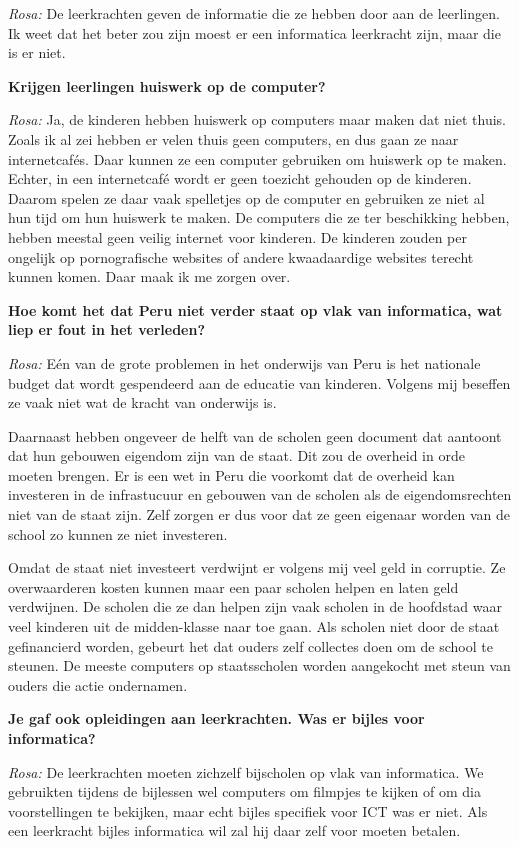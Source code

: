 \textit{Rosa:} De leerkrachten geven de informatie die ze hebben door aan de leerlingen. Ik weet dat het beter zou zijn moest er een informatica leerkracht zijn, maar die is er niet.

\textbf{Krijgen leerlingen huiswerk op de computer?}

\textit{Rosa:} Ja, de kinderen hebben huiswerk op computers maar maken dat niet thuis. Zoals ik al zei hebben er velen thuis geen computers, en dus gaan ze naar internetcafés. Daar kunnen ze een computer gebruiken om huiswerk op te maken. Echter, in een internetcafé wordt er geen toezicht gehouden op de kinderen. Daarom spelen ze daar vaak spelletjes op de computer en gebruiken ze niet al hun tijd om hun huiswerk te maken. De computers die ze ter beschikking hebben, hebben meestal geen veilig internet voor kinderen. De kinderen zouden per ongelijk op pornografische websites of andere kwaadaardige websites terecht kunnen komen. Daar maak ik me zorgen over.

\textbf{Hoe komt het dat Peru niet verder staat op vlak van informatica, wat liep er fout in het verleden?}

\textit{Rosa:} Eén van de grote problemen in het onderwijs van Peru is het nationale budget dat wordt gespendeerd aan de educatie van kinderen. Volgens mij beseffen ze vaak niet wat de kracht van onderwijs is. 

Daarnaast hebben ongeveer de helft van de scholen geen document dat aantoont dat hun gebouwen eigendom zijn van de staat. Dit zou de overheid in orde moeten brengen. Er is een wet in Peru die voorkomt dat de overheid kan investeren in de infrastucuur en gebouwen van de scholen als de eigendomsrechten niet van de staat zijn. Zelf zorgen er dus voor dat ze geen eigenaar worden van de school zo kunnen ze niet investeren.

Omdat de staat niet investeert verdwijnt er volgens mij veel geld in corruptie. Ze overwaarderen kosten kunnen maar een paar scholen helpen en laten geld verdwijnen. De scholen die ze dan helpen zijn vaak scholen in de hoofdstad waar veel kinderen uit de midden-klasse naar toe gaan. Als scholen niet door de staat gefinancierd worden, gebeurt het dat ouders zelf collectes doen om de school te steunen. De meeste computers op staatsscholen worden aangekocht met steun van ouders die actie ondernamen. 

\textbf{Je gaf ook opleidingen aan leerkrachten. Was er bijles voor informatica?}

\textit{Rosa:} De leerkrachten moeten zichzelf bijscholen op vlak van informatica. We gebruikten tijdens de bijlessen wel computers om filmpjes te kijken of om dia voorstellingen te bekijken, maar echt bijles specifiek voor ICT was er niet. Als een leerkracht bijles informatica wil zal hij daar zelf voor moeten betalen.

